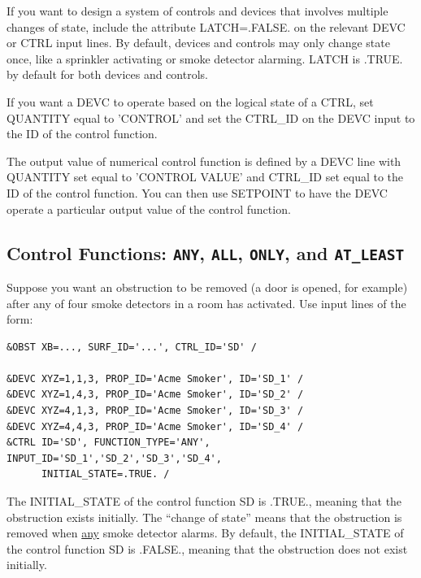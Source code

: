 \documentclass[11pt]{book}
\begin{document}
If you want to design a system of controls and devices that involves multiple changes of state,
include the attribute {\ct LATCH=.FALSE.} on the relevant {\ct DEVC} or {\ct CTRL} input lines.
By default, devices and controls may only change state once, like a sprinkler activating or
smoke detector alarming. {\ct LATCH} is {\ct .TRUE.} by default for both devices and controls.

If you want a {\ct DEVC} to operate based on the logical state of a {\ct CTRL}, set {\ct QUANTITY} equal to {\ct 'CONTROL'} and set the {\ct CTRL\_ID} on the {\ct DEVC} input to the {\ct ID} of the control function.

The output value of numerical control function is defined by a {\ct DEVC} line with {\ct QUANTITY} set equal to {\ct 'CONTROL VALUE'} and {\ct CTRL\_ID} set equal to the {\ct ID} of the control function.  You can then use {\ct SETPOINT} to have the {\ct DEVC} operate a particular output value of the control function.

\subsection{Control Functions: \texorpdfstring{{\tt ANY}}{ANY}, \texorpdfstring{{\tt ALL}}{ALL}, \texorpdfstring{{\tt ONLY}}{ONLY}, and
\texorpdfstring{{\tt AT\_LEAST}}{AT\_LEAST}}

\label{info:FUNCTION_TYPE}

Suppose you want an obstruction to be removed (a door is opened, for example) after any
of four smoke detectors in a room has activated. Use input lines of the form:

\begin{lstlisting}
&OBST XB=..., SURF_ID='...', CTRL_ID='SD' /

&DEVC XYZ=1,1,3, PROP_ID='Acme Smoker', ID='SD_1' /
&DEVC XYZ=1,4,3, PROP_ID='Acme Smoker', ID='SD_2' /
&DEVC XYZ=4,1,3, PROP_ID='Acme Smoker', ID='SD_3' /
&DEVC XYZ=4,4,3, PROP_ID='Acme Smoker', ID='SD_4' /
&CTRL ID='SD', FUNCTION_TYPE='ANY', INPUT_ID='SD_1','SD_2','SD_3','SD_4',
      INITIAL_STATE=.TRUE. /
\end{lstlisting}

\noindent
The {\ct INITIAL\_STATE} of the control function {\ct SD} is {\ct .TRUE.},
meaning that the obstruction exists initially. The ``change of state'' means that the obstruction is
removed when \underline{any} smoke detector alarms.  By default, the {\ct INITIAL\_STATE}
of the control function {\ct SD} is {\ct .FALSE.}, meaning that the obstruction does not exist initially.
\end{document}
